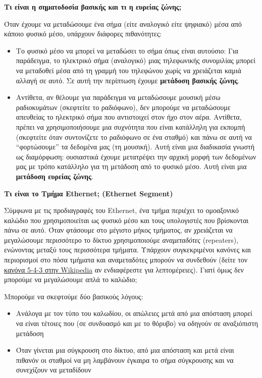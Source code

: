 \begin{inthebox}
\textbf{Τι είναι η σηματοδοσία βασικής και τι η ευρείας ζώνης;}

Όταν έχουμε να μεταδώσουμε ένα σήμα (είτε αναλογικό είτε ψηφιακό) μέσα από κάποιο φυσικό μέσο, υπάρχουν διάφορες πιθανότητες:

\begin{itemize}
\item Το φυσικό μέσο να μπορεί να μεταδώσει το σήμα όπως είναι αυτούσιο: Για παράδειγμα, το ηλεκτρικό σήμα (αναλογικό) μιας τηλεφωνικής συνομιλίας μπορεί να μεταδοθεί μέσα από τη γραμμή του τηλεφώνου χωρίς να χρειάζεται καμιά αλλαγή σε αυτό. Σε αυτή την περίπτωση έχουμε \textbf{μετάδοση βασικής ζώνης}.
\item Αντίθετα, αν θέλουμε για παράδειγμα να μεταδώσουμε μουσική μέσω ραδιοκυμάτων (σκεφτείτε το ραδιόφωνο), δεν μπορούμε να μεταδώσουμε απευθείας το ηλεκτρικό σήμα που αντιστοιχεί στον ήχο στον αέρα. Αντίθετα, πρέπει να χρησιμοποιήσουμε μια συχνότητα που είναι κατάλληλη για εκπομπή (σκεφτείτε όταν συντονίζετε το ραδιόφωνο σε ένα σταθμό) και πάνω σε αυτή να ``φορτώσουμε'' τα δεδομένα μας (τη μουσική). Αυτή είναι μια διαδικασία γνωστή ως διαμόρφωση: ουσιαστικά έχουμε μετατρέψει την αρχική μορφή των δεδομένων μας με τρόπο κατάλληλο για τη μετάδοση από το φυσικό μέσο. Αυτή είναι μια \textbf{μετάδοση ευρείας ζώνης}.
\end{itemize}

\textbf{Τι είναι το Τμήμα Ethernet; (Ethernet Segment)}

Σύμφωνα με τις προδιαγραφές του Ethernet, ένα τμήμα περιέχει το ομοαξονικό καλώδιο που χρησιμοποιείται ως φυσικό μέσο και τους υπολογιστές που βρίσκονται πάνω σε αυτό. Όταν φτάσουμε στο μέγιστο μήκος τμήματος, αν χρειάζεται να μεγαλώσουμε περισσότερο το δίκτυο χρησιμοποιούμε \emph{αναμεταδότες} (repeaters), ενώνοντας μεταξύ τους περισσότερα τμήματα. Υπάρχουν συγκεκριμένοι κανόνες και περιορισμοί στο πόσα τμήματα και αναμεταδότες μπορούν να συνδεθούν (δείτε τον \href{https://en.wikipedia.org/wiki/5-4-3_rule}{κανόνα 5-4-3 στην Wikipedia} αν ενδιαφέρεστε για λεπτομέρειες). Γιατί όμως δεν μπορούμε να μεγαλώσουμε απλά το καλώδιο;

Μπορούμε να σκεφτούμε δύο βασικούς λόγους:

\begin{itemize}
\item Ανάλογα με τον τύπο του καλωδίου, οι απώλειες μετά από μια απόσταση μπορεί να είναι τέτοιες που (σε συνδυασμό και με το θόρυβο) να οδηγούν σε αναξιόπιστη μετάδοση
\item Όταν γίνεται μια σύγκρουση στο δίκτυο, από μια απόσταση και μετά είναι πιθανόν οι σταθμοί να μη λαμβάνουν έγκαιρα το σήμα σύγκρουσης και να συνεχίζουν να μεταδίδουν
\end{itemize}
\end{inthebox}

